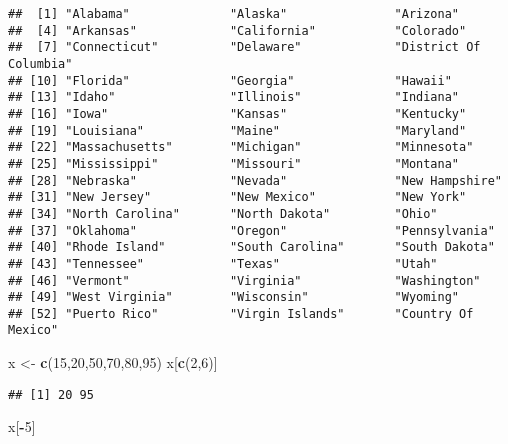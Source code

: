 \documentclass[]{article}
\newenvironment{Shaded}{\begin{snugshade}}{\end{snugshade}}
\newcommand{\KeywordTok}[1]{\textcolor[rgb]{0.13,0.29,0.53}{\textbf{#1}}}
\newcommand{\DecValTok}[1]{\textcolor[rgb]{0.00,0.00,0.81}{#1}}
\newcommand{\StringTok}[1]{\textcolor[rgb]{0.31,0.60,0.02}{#1}}
\newcommand{\OperatorTok}[1]{\textcolor[rgb]{0.81,0.36,0.00}{\textbf{#1}}}
\newcommand{\NormalTok}[1]{#1}
\begin{document}
\begin{verbatim}
##  [1] "Alabama"              "Alaska"               "Arizona"             
##  [4] "Arkansas"             "California"           "Colorado"            
##  [7] "Connecticut"          "Delaware"             "District Of Columbia"
## [10] "Florida"              "Georgia"              "Hawaii"              
## [13] "Idaho"                "Illinois"             "Indiana"             
## [16] "Iowa"                 "Kansas"               "Kentucky"            
## [19] "Louisiana"            "Maine"                "Maryland"            
## [22] "Massachusetts"        "Michigan"             "Minnesota"           
## [25] "Mississippi"          "Missouri"             "Montana"             
## [28] "Nebraska"             "Nevada"               "New Hampshire"       
## [31] "New Jersey"           "New Mexico"           "New York"            
## [34] "North Carolina"       "North Dakota"         "Ohio"                
## [37] "Oklahoma"             "Oregon"               "Pennsylvania"        
## [40] "Rhode Island"         "South Carolina"       "South Dakota"        
## [43] "Tennessee"            "Texas"                "Utah"                
## [46] "Vermont"              "Virginia"             "Washington"          
## [49] "West Virginia"        "Wisconsin"            "Wyoming"             
## [52] "Puerto Rico"          "Virgin Islands"       "Country Of Mexico"
\end{verbatim}

\begin{Shaded}
\begin{Highlighting}[]
\NormalTok{x <-}\StringTok{ }\KeywordTok{c}\NormalTok{(}\DecValTok{15}\NormalTok{,}\DecValTok{20}\NormalTok{,}\DecValTok{50}\NormalTok{,}\DecValTok{70}\NormalTok{,}\DecValTok{80}\NormalTok{,}\DecValTok{95}\NormalTok{)}
\NormalTok{x[}\KeywordTok{c}\NormalTok{(}\DecValTok{2}\NormalTok{,}\DecValTok{6}\NormalTok{)]}
\end{Highlighting}
\end{Shaded}

\begin{verbatim}
## [1] 20 95
\end{verbatim}

\begin{Shaded}
\begin{Highlighting}[]
\NormalTok{x[}\OperatorTok{-}\DecValTok{5}\NormalTok{]}
\end{Highlighting}
\end{Shaded}
\end{document}
